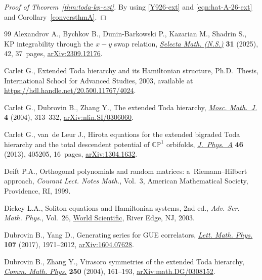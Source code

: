 \documentclass[11pt]{article}
\numberwithin{equation}{section}
\numberwithin{equation}{section}
\begin{document}
\begin{proof}[Proof of Theorem~\ref{thm:toda-kp-ext}]
By using \eqref{Y926-ext} and \eqref{eqn:hat-A-26-ext} and Corollary~\ref{conversthmA}.
\end{proof}
\begin{thebibliography}{99}
Alexandrov A., Bychkov B., Dunin-Barkowski P., Kazarian M., Shadrin S., K{P}
 integrability through the {$x-y$} swap relation,
 \href{https://doi.org/10.1007/s00029-025-01035-8}{\textit{Selecta Math.
 (N.S.)}} \textbf{31} (2025), 42, 37~pages,
 \href{http://arxiv.org/abs/2309.12176}{arXiv:2309.12176}.

Carlet G., Extended {T}oda hierarchy and its {H}amiltonian structure, Ph.D.~Thesis, {I}nternational School for Advanced Studies, 2003, available at
 \url{https://hdl.handle.net/20.500.11767/4024}.

Carlet G., Dubrovin B., Zhang Y., The extended {T}oda hierarchy,
 \href{https://doi.org/10.17323/1609-4514-2004-4-2-313-332}{\textit{Mosc.
 Math.~J.}} \textbf{4} (2004), 313--332,
 \href{http://arxiv.org/abs/nlin.SI/0306060}{arXiv:nlin.SI/0306060}.

Carlet G., van~de Leur J., Hirota equations for the extended bigraded {T}oda
 hierarchy and the total descendent potential of {$\mathbb{CP}^1$} orbifolds,
 \href{https://doi.org/10.1088/1751-8113/46/40/405205}{\textit{J.~Phys.~A}}
 \textbf{46} (2013), 405205, 16~pages,
 \href{http://arxiv.org/abs/1304.1632}{arXiv:1304.1632}.

Deift P.A., Orthogonal polynomials and random matrices: a~{R}iemann--{H}ilbert
 approach, \textit{Courant Lect. Notes Math.}, Vol.~3, American Mathematical
 Society, Providence, RI, 1999.

Dickey L.A., Soliton equations and {H}amiltonian systems, 2nd ed., \textit{Adv. Ser.
 Math. Phys.}, Vol.~26, \href{https://doi.org/10.1142/5108}{World
 Scientific}, River Edge, NJ, 2003.

Dubrovin B., Yang D., Generating series for {GUE} correlators,
 \href{https://doi.org/10.1007/s11005-017-0975-6}{\textit{Lett. Math. Phys.}}
 \textbf{107} (2017), 1971--2012,
 \href{http://arxiv.org/abs/1604.07628}{arXiv:1604.07628}.

Dubrovin B., Zhang Y., Virasoro symmetries of the extended {T}oda hierarchy,
 \href{https://doi.org/10.1007/s00220-004-1084-9}{\textit{Comm. Math. Phys.}}
 \textbf{250} (2004), 161--193,
 \href{http://arxiv.org/abs/math.DG/0308152}{arXiv:math.DG/0308152}.


\end{thebibliography}
\end{document}
